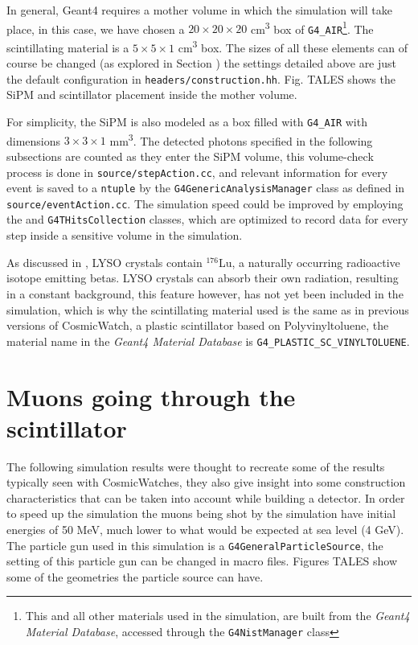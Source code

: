In general, Geant4 requires a mother volume in which the simulation will take place, in this case, we have chosen a $20\times20\times20$ \unit{\cm\cubed} box of \texttt{G4\_AIR}\footnote{This and all other materials used in the simulation, are built from the \textit{Geant4 Material Database}, accessed through the \texttt{G4NistManager} class}. The scintillating material is a $5\times5\times1$ \unit{\cm\cubed} box. The sizes of all these elements can of course be changed (as explored in Section ) the settings detailed above are just the default configuration in \texttt{headers/construction.hh}. Fig. TALES shows the SiPM and scintillator placement inside the mother volume.


For simplicity, the SiPM is also modeled as a box filled with \texttt{G4\_AIR} with dimensions $3\times3\times1$ \unit{\mm\cubed}. The detected photons specified in the following subsections are counted as they enter the SiPM volume, this volume-check process is done in \texttt{source/stepAction.cc}, and relevant information for every event is saved to a \texttt{ntuple} by the \texttt{G4GenericAnalysisManager} class as defined in \texttt{source/eventAction.cc}. The simulation speed could be improved by employing the  and \texttt{G4THitsCollection} classes, which are optimized to record data for every step inside a sensitive volume in the simulation.

As discussed in , LYSO crystals contain $^{176}$Lu, a naturally occurring radioactive isotope emitting betas. LYSO crystals can absorb their own radiation, resulting in a constant background, this feature however, has not yet been included in the simulation, which is why the scintillating material used is the same as in previous versions of CosmicWatch, a plastic scintillator based on Polyvinyltoluene, the material name in the \textit{Geant4 Material Database} is \texttt{G4\_PLASTIC\_SC\_VINYLTOLUENE}.

\section{Muons going through the scintillator}

The following simulation results were thought to recreate some of the results typically seen with CosmicWatches, they also give insight into some construction characteristics that can be taken into account while building a detector. In order to speed up the simulation the muons being shot by the simulation have initial energies of 50 \unit{\mega\eV}, much lower to what would be expected at sea level (4 \unit{\giga\eV}). The particle gun used in this simulation is a \texttt{G4GeneralParticleSource}, the setting of this particle gun can be changed in macro files. Figures TALES show some of the geometries the particle source can have.

